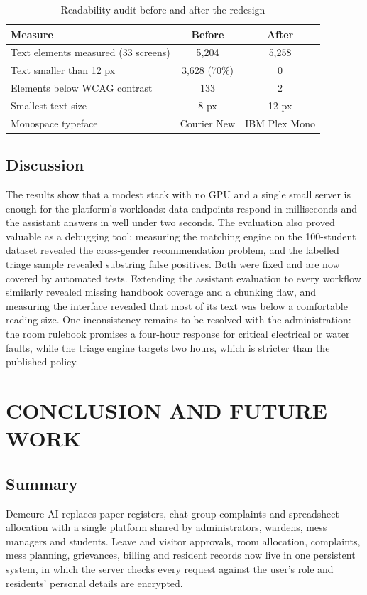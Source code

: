 \documentclass[12pt,a4paper,oneside]{report}
\newcommand{\head}{\rowcolor{headblue}}
\begin{document}
\begin{table}[!htbp]\centering\small
\caption{Readability audit before and after the redesign}\label{tab:readability}
\begin{tabular}{p{3.0in}cc}
\toprule\head \textbf{Measure} & \textbf{Before} & \textbf{After}\\\midrule
Text elements measured (33 screens) & 5,204 & 5,258\\
Text smaller than 12 px & 3,628 (70\%) & 0\\
Elements below WCAG contrast & 133 & 2\\
Smallest text size & 8 px & 12 px\\
Monospace typeface & Courier New & IBM Plex Mono\\
\bottomrule
\end{tabular}
\end{table}

\section{Discussion}
The results show that a modest stack with no GPU and a single small server is enough for the platform's workloads: data
endpoints respond in milliseconds and the assistant answers in well under two seconds. The evaluation also proved
valuable as a debugging tool: measuring the matching engine on the 100-student dataset revealed the cross-gender
recommendation problem, and the labelled triage sample revealed substring false positives. Both were fixed and are now covered by automated tests. Extending the assistant evaluation to every
workflow similarly revealed missing handbook coverage and a chunking flaw, and measuring the interface revealed that
most of its text was below a comfortable reading size. One inconsistency remains to be resolved with the administration: the room rulebook
promises a four-hour response for critical electrical or water faults, while the triage engine targets two hours, which
is stricter than the published policy.

\chapter{CONCLUSION AND FUTURE WORK}
\section{Summary}
Demeure AI replaces paper registers, chat-group complaints and spreadsheet allocation with a single platform shared
by administrators, wardens, mess managers and students. Leave and visitor approvals, room allocation, complaints, mess
planning, grievances, billing and resident records now live in one persistent system, in which the server checks every
request against the user's role and residents' personal details are encrypted.
\end{document}
